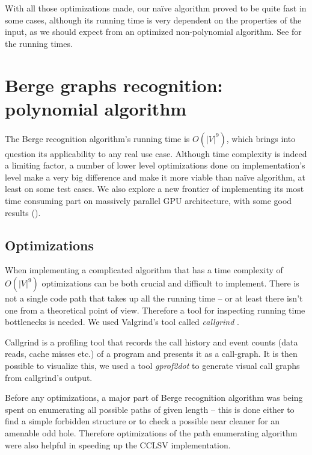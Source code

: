 With all those optimizations made, our na\"ive algorithm proved to be quite fast in some cases, although its running time is very dependent on the properties of the input, as we should expect from an optimized non-polynomial algorithm. See  for the running times.

\section{Berge graphs recognition: polynomial algorithm}

The Berge recognition algorithm's running time is $O(|V|^9)$, which brings into question its applicability to any real use case. Although time complexity is indeed a limiting factor, a number of lower level optimizations done on implementation's level make a very big difference and make it more viable than na\"ive algorithm, at least on some test cases. We also explore a new frontier of implementing its most time consuming part on massively parallel GPU architecture, with some good results ().

\subsection{Optimizations}
\label{sec:Optimizations}

When implementing a complicated algorithm that has a time complexity of $O(|V|^9)$ optimizations can be both crucial and difficult to implement. There is not a single code path that takes up all the running time -- or at least there isn't one from a theoretical point of view. Therefore a tool for inspecting running time bottlenecks is needed. We used Valgrind's tool called \emph{callgrind} \cite{callgrind}.


Callgrind is a profiling tool that records the call history and event counts (data reads, cache misses etc.) of a program and presents it as a call-graph. It is then possible to visualize this, we used a tool \emph{gprof2dot} \cite{gprof2dot} to generate visual call graphs from callgrind's output.

Before any optimizations, a major part of Berge recognition algorithm was being spent on enumerating all possible paths of given length -- this is done either to find a simple forbidden structure or to check a possible near cleaner for an amenable odd hole. Therefore optimizations of the path enumerating algorithm were also helpful in speeding up the CCLSV implementation.

